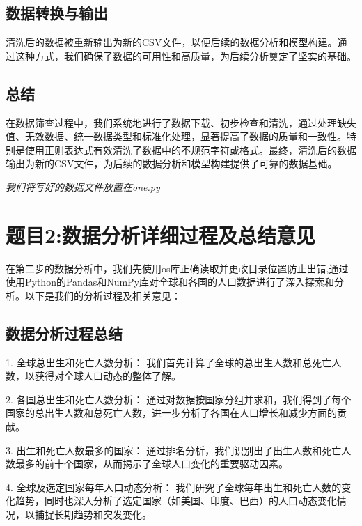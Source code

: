 \documentclass{ctexart}
\begin{document}
    \subsection{\textbf{数据转换与输出}}

    \noindent 清洗后的数据被重新输出为新的CSV文件，以便后续的数据分析和模型构建。通过这种方式，我们确保了数据的可用性和高质量，为后续分析奠定了坚实的基础。

    \subsection{\textbf{总结}}

    \noindent 在数据筛查过程中，我们系统地进行了数据下载、初步检查和清洗，通过处理缺失值、无效数据、统一数据类型和标准化处理，显著提高了数据的质量和一致性。特别是使用正则表达式有效清洗了数据中的不规范字符或格式。最终，清洗后的数据输出为新的CSV文件，为后续的数据分析和模型构建提供了可靠的数据基础。
    \par \vspace{1cm} \noindent \emph{我们将写好的数据文件放置在one.py}
    \section{\textbf{题目2:数据分析详细过程及总结意见}}
    
    \noindent 在第二步的数据分析中，我们先使用os库正确读取并更改目录位置防止出错,通过使用Python的Pandas和NumPy库对全球和各国的人口数据进行了深入探索和分析。以下是我们的分析过程及相关意见：
    
    \subsection{\textbf{数据分析过程总结}}
    
    1. 全球总出生和死亡人数分析：
    我们首先计算了全球的总出生人数和总死亡人数，以获得对全球人口动态的整体了解。
    
    2. 各国总出生和死亡人数分析：
    通过对数据按国家分组并求和，我们得到了每个国家的总出生人数和总死亡人数，进一步分析了各国在人口增长和减少方面的贡献。
    
    3. 出生和死亡人数最多的国家：
    通过排名分析，我们识别出了出生人数和死亡人数最多的前十个国家，从而揭示了全球人口变化的重要驱动因素。
    
    4. 全球及选定国家每年人口动态分析：
    我们研究了全球每年出生和死亡人数的变化趋势，同时也深入分析了选定国家（如美国、印度、巴西）的人口动态变化情况，以捕捉长期趋势和突发变化。
    
\end{document}
